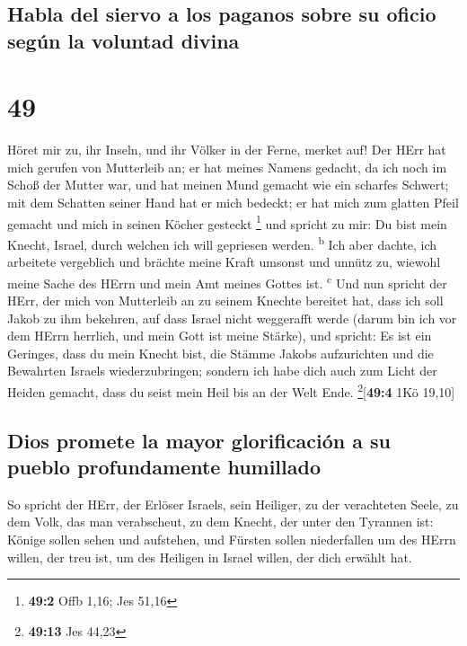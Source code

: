 \hypertarget{habla-del-siervo-a-los-paganos-sobre-su-oficio-seguxfan-la-voluntad-divina}{%
\subsection{Habla del siervo a los paganos sobre su oficio según la
voluntad
divina}\label{habla-del-siervo-a-los-paganos-sobre-su-oficio-seguxfan-la-voluntad-divina}}

\hypertarget{section-48}{%
\section{49}\label{section-48}}

 Höret mir zu, ihr Inseln, und ihr Völker in der Ferne,
merket auf! Der HErr hat mich gerufen von Mutterleib an; er hat meines
Namens gedacht, da ich noch im Schoß der Mutter war,  und
hat meinen Mund gemacht wie ein scharfes Schwert; mit dem Schatten
seiner Hand hat er mich bedeckt; er hat mich zum glatten Pfeil gemacht
und mich in seinen Köcher gesteckt \footnote{\textbf{49:2} Offb 1,16;
  Jes 51,16}  und spricht zu mir: Du bist mein Knecht,
Israel, durch welchen ich will gepriesen werden. \textsuperscript{b}
 Ich aber dachte, ich arbeitete vergeblich und brächte
meine Kraft umsonst und unnütz zu, wiewohl meine Sache des HErrn und
mein Amt meines Gottes ist. \textsuperscript{c}  Und nun
spricht der HErr, der mich von Mutterleib an zu seinem Knechte bereitet
hat, dass ich soll Jakob zu ihm bekehren, auf dass Israel nicht
weggerafft werde (darum bin ich vor dem HErrn herrlich, und mein Gott
ist meine Stärke),  und spricht: Es ist ein Geringes, dass
du mein Knecht bist, die Stämme Jakobs aufzurichten und die Bewahrten
Israels wiederzubringen; sondern ich habe dich auch zum Licht der Heiden
gemacht, dass du seist mein Heil bis an der Welt Ende.
\footnote{\textbf{49:13} Jes 44,23}{[}\textbf{49:4} 1Kö 19,10{]}

\hypertarget{dios-promete-la-mayor-glorificaciuxf3n-a-su-pueblo-profundamente-humillado}{%
\subsection{Dios promete la mayor glorificación a su pueblo
profundamente
humillado}\label{dios-promete-la-mayor-glorificaciuxf3n-a-su-pueblo-profundamente-humillado}}

 So spricht der HErr, der Erlöser Israels, sein Heiliger,
zu der verachteten Seele, zu dem Volk, das man verabscheut, zu dem
Knecht, der unter den Tyrannen ist: Könige sollen sehen und aufstehen,
und Fürsten sollen niederfallen um des HErrn willen, der treu ist, um
des Heiligen in Israel willen, der dich erwählt hat.

